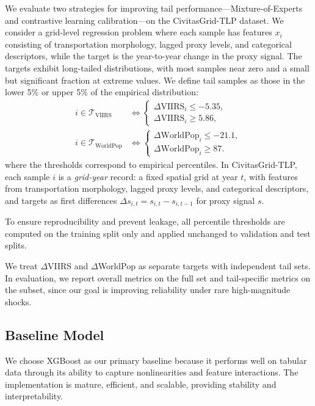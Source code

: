 \documentclass[pdflatex,sn-basic,Numbered]{sn-jnl}
\begin{document}
We evaluate two strategies for improving tail performance—Mixture-of-Experts and contrastive learning calibration—on the CivitasGrid-TLP dataset. We consider a grid-level regression problem where each sample has features $x_i$ consisting of transportation morphology, lagged proxy levels, and categorical descriptors, while the target is the year-to-year change in the proxy signal. The targets exhibit long-tailed distributions, with most samples near zero and a small but significant fraction at extreme values. We define tail samples as those in the lower 5\% or upper 5\% of the empirical distribution:
\begin{equation}
\begin{aligned}
i\in\mathcal{T}_{\mathrm{VIIRS}} &\iff
\begin{cases}
\Delta \mathrm{VIIRS}_i \le -5.35,\\
\Delta \mathrm{VIIRS}_i \ge 5.86,
\end{cases}\\
i\in\mathcal{T}_{\mathrm{WorldPop}} &\iff
\begin{cases}
\Delta \mathrm{WorldPop}_i \le -21.1,\\
\Delta \mathrm{WorldPop}_i \ge 87.
\end{cases}
\end{aligned}
\end{equation}
where the thresholds correspond to empirical percentiles. In CivitasGrid-TLP, each sample $i$ is a \emph{grid-year} record: a fixed spatial grid at year $t$, with features from transportation morphology, lagged proxy levels, and categorical descriptors, and targets as first differences $\Delta s_{i,t} = s_{i,t}-s_{i,t-1}$ for proxy signal $s$.

To ensure reproducibility and prevent leakage, all percentile thresholds are computed on the training split only and applied unchanged to validation and test splits.

We treat $\Delta$VIIRS and $\Delta$WorldPop as separate targets with independent tail sets. In evaluation, we report overall metrics on the full set and tail-specific metrics on the subset, since our goal is improving reliability under rare high-magnitude shocks.

\subsection{Baseline Model}

We choose XGBoost as our primary baseline because it performs well on tabular data through its ability to capture nonlinearities and feature interactions. The implementation is mature, efficient, and scalable, providing stability and interpretability.
\end{document}
